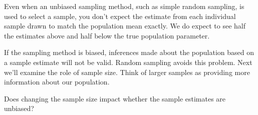        Even when an unbiased sampling method, such as simple random
       sampling, is used to select a sample, you don't expect the
       estimate from each individual sample drawn to match the
       population mean exactly. We do expect to see half the estimates
       above and half below the true population parameter.

       If the sampling method is biased, inferences made about the
       population based on a sample estimate will not be valid. Random
       sampling avoids this problem.   Next we'll examine the role of
        sample size.  Think of larger samples as providing more
        information about our population.

        \begin{center}
         {\large \sf Does changing the sample size impact whether the
           sample estimates are unbiased?} 
       \end{center}
     

